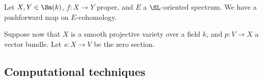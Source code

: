 \begin{definition}
	Let $X,Y\in \Sm(k)$, $f:X\to Y$ proper, and $E$ a $\SL$-oriented spectrum. We have a pushforward map on $E$-cohomology.
\end{definition}


Suppose now that $X$ is a smooth projective variety over a field $k$, and $p:V\to X$ a vector bundle. Let $s:X\to V$ be the zero section. 




\subsection{Computational techniques}
















